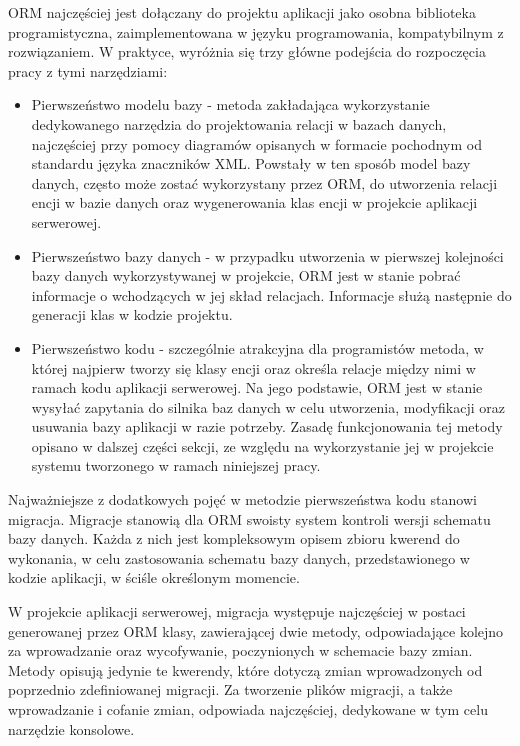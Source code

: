 ORM najczęściej jest dołączany do projektu aplikacji jako osobna biblioteka programistyczna, zaimplementowana w języku programowania, kompatybilnym z rozwiązaniem. W praktyce, wyróżnia się trzy główne podejścia do rozpoczęcia pracy z tymi narzędziami:

\begin{itemize}
    \item Pierwszeństwo modelu bazy - metoda zakładająca wykorzystanie dedykowanego narzędzia do projektowania relacji w bazach danych, najczęściej przy pomocy diagramów opisanych w formacie pochodnym od standardu języka znaczników XML. Powstały w ten sposób model bazy danych, często może zostać wykorzystany przez ORM, do utworzenia relacji encji w bazie danych oraz wygenerowania klas encji w projekcie aplikacji serwerowej.
    \item Pierwszeństwo bazy danych - w przypadku utworzenia w pierwszej kolejności bazy danych wykorzystywanej w projekcie, ORM jest w stanie pobrać informacje o wchodzących w jej skład relacjach. Informacje służą następnie do generacji klas w kodzie projektu.
    \item Pierwszeństwo kodu - szczególnie atrakcyjna dla programistów metoda, w której najpierw tworzy się klasy encji oraz określa relacje między nimi w ramach kodu aplikacji serwerowej. Na jego podstawie, ORM jest w stanie wysyłać zapytania do silnika baz danych w celu utworzenia, modyfikacji oraz usuwania bazy aplikacji w razie potrzeby.  Zasadę funkcjonowania tej metody opisano w dalszej części sekcji, ze względu na wykorzystanie jej w projekcie systemu tworzonego w ramach niniejszej pracy.
\end{itemize}

Najważniejsze z dodatkowych pojęć w metodzie pierwszeństwa kodu stanowi migracja. Migracje stanowią dla ORM swoisty system kontroli wersji schematu bazy danych. Każda z nich jest kompleksowym opisem zbioru kwerend do wykonania, w celu zastosowania schematu bazy danych, przedstawionego w kodzie aplikacji, w ściśle określonym momencie.

W projekcie aplikacji serwerowej, migracja występuje najczęściej w postaci generowanej przez ORM klasy, zawierającej dwie metody, odpowiadające kolejno za wprowadzanie oraz wycofywanie, poczynionych w schemacie bazy zmian. Metody opisują jedynie te kwerendy, które dotyczą zmian wprowadzonych od poprzednio zdefiniowanej migracji. Za tworzenie plików migracji, a także wprowadzanie i cofanie zmian, odpowiada najczęściej, dedykowane w tym celu narzędzie konsolowe.

